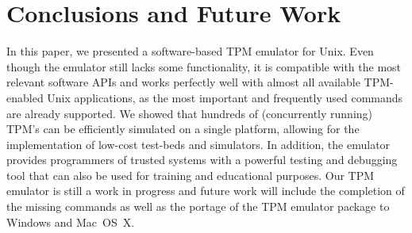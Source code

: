 \documentclass[runningheads]{llncs}
\begin{document}
\section{Conclusions and Future Work}
In this paper, we presented a software-based TPM emulator for Unix. Even though the emulator still
lacks some functionality, it is compatible with the most relevant software APIs and works perfectly
well with almost all available TPM-enabled Unix applications, as the most important and frequently
used commands are already supported. We showed that hundreds of (concurrently running) TPM's can
be efficiently simulated on a single platform, allowing for the implementation of low-cost test-beds
and simulators. In addition, the emulator provides programmers of trusted systems with a powerful
testing and debugging tool that can also be used for training and educational purposes. Our TPM
emulator is still a work in progress and future work will include the completion of the missing
commands as well as the portage of the TPM emulator package to Windows and Mac~OS~X.



\end{document}

